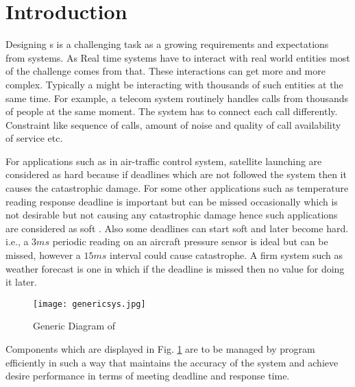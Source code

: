 \section{Introduction}\label{sec:introduction}
Designing \rts s is a challenging task as a growing requirements and expectations from systems. As Real time systems have to interact with real world entities most of the challenge comes from that. These interactions can get more and more complex. Typically a \rts might be interacting with thousands of such entities at the same time. For example, a telecom system routinely handles calls from thousands of people at the same moment. The system has to connect each call differently. Constraint like sequence of calls, amount of noise and quality of call availability of service etc.

For applications such as in air-traffic control system, satellite launching are considered as hard \rts because if deadlines which are not followed the system then it causes the catastrophic damage. For some other applications such as temperature reading response deadline is important but can be missed occasionally which is not desirable but not causing any catastrophic damage hence such applications are considered as soft \rts. Also some deadlines can start soft and later become hard. i.e., a $ 3 ms $ periodic reading on an aircraft pressure sensor is ideal but can be missed, however a $ 15 ms $ interval could cause catastrophe. A firm system such as weather forecast is one in which if the deadline is missed then no value for doing it later.

\begin{figure}[!htbp]
    \centering
    \texttt{[image: genericsys.jpg]}
    \caption{Generic Diagram of \rts\cite{realTimeIssues}}\label{fig:generic-rts}
\end{figure}

Components which are displayed in Fig. \ref{fig:generic-rts} are to be managed by program efficiently in such a way that maintains the accuracy of the system and achieve desire performance in terms of meeting deadline and response time.